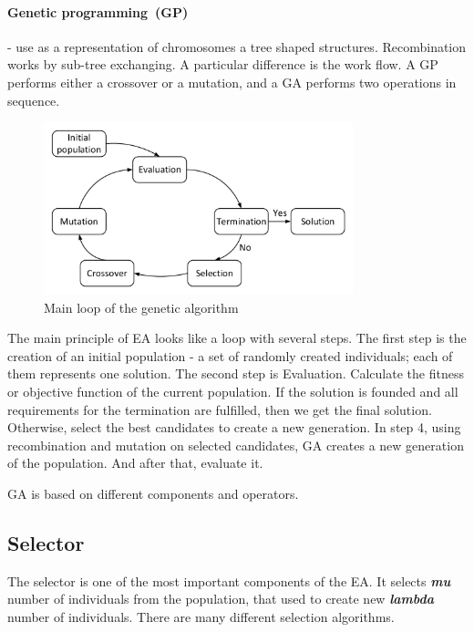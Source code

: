 	\paragraph{Genetic programming~(GP)} - use as a representation of chromosomes a tree shaped structures. Recombination works by sub-tree exchanging. A particular difference is the work flow. A GP performs either a crossover or a mutation, and a GA performs two operations in sequence.

\begin{figure}
	\centering
	\includegraphics[width=0.8\textwidth]{images/GeneticLoop}
	\caption[Main loop of the genetic algorithm]{Main loop of the genetic algorithm}
	\label{fig:GeneticLoop}
\end{figure}

The main principle of EA looks like a loop with several steps.
The first step is the creation of an initial population - a set of randomly created individuals; each of them represents one solution. 
The second step is Evaluation. Calculate the fitness or objective function of the current population.
If the solution is founded and all requirements for the termination are fulfilled, then we get the final solution. Otherwise, select the best candidates to create a new generation.
In step 4, using recombination and mutation on selected candidates, GA creates a new generation of the population. And after that, evaluate it.

GA is based on different components and operators.

\subsection{Selector}\label{sec:GeneticAlgorithm:Selector}

The selector is one of the most important components of the EA. It selects \textit{\textbf{mu}} number of individuals from the population, that used to create new \textit{\textbf{lambda}} number of individuals. There are many different selection algorithms.


